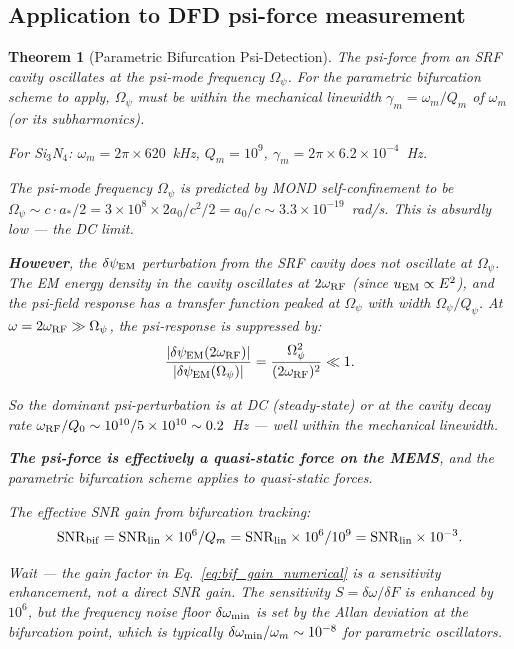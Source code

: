 \documentclass[11pt]{article}
\newcommand{\Opsi}{\Omega_\psi}
\newcommand{\ee}[1]{\times 10^{#1}}
\newcommand{\Qpsi}{Q_\psi}
\newcommand{\SNR}{\mathrm{SNR}}
\newcommand{\dpsiEM}{\delta\psi_{\rm EM}}
\newtheorem{theorem}{Theorem}[section]
\theoremstyle{definition}
\theoremstyle{remark}
\begin{document}
\subsection{Application to DFD psi-force measurement}

\begin{theorem}[Parametric Bifurcation Psi-Detection]
\label{thm:parametric}
The psi-force from an SRF cavity oscillates at the psi-mode frequency
$\Opsi$. For the parametric bifurcation scheme to apply, $\Opsi$ must
be within the mechanical linewidth $\gamma_m = \omega_m/Q_m$ of
$\omega_m$ (or its subharmonics).

For Si$_3$N$_4$: $\omega_m = 2\pi \times 620$~kHz, $Q_m = 10^9$,
$\gamma_m = 2\pi \times 6.2\ee{-4}$~Hz.

The psi-mode frequency $\Opsi$ is predicted by MOND self-confinement
to be $\Opsi \sim c \cdot a_*/2 = 3\ee{8} \times 2a_0/c^2 / 2
= a_0/c \sim 3.3\ee{-19}$~rad/s. This is absurdly low --- the
DC limit.

\textbf{However}, the $\dpsiEM$ perturbation from the SRF cavity
does \emph{not} oscillate at $\Opsi$. The EM energy density in the
cavity oscillates at $2\omega_{\rm RF}$ (since $u_{\rm EM} \propto
E^2$), and the psi-field response has a transfer function peaked at
$\Opsi$ with width $\Opsi/\Qpsi$. At $\omega = 2\omega_{\rm RF}
\gg \Opsi$, the psi-response is suppressed by:
\begin{equation}
\frac{|\dpsiEM(2\omega_{\rm RF})|}{|\dpsiEM(\Opsi)|}
= \frac{\Opsi^2}{(2\omega_{\rm RF})^2} \ll 1.
\end{equation}

So the dominant psi-perturbation is at DC (steady-state) or at the
cavity decay rate $\omega_{\rm RF}/Q_0 \sim 10^{10}/5\ee{10}
\sim 0.2$~Hz --- well within the mechanical linewidth.

\textbf{The psi-force is effectively a quasi-static force on the
MEMS}, and the parametric bifurcation scheme applies to quasi-static
forces.

The effective SNR gain from bifurcation tracking:
\begin{equation}
\SNR_{\rm bif} = \SNR_{\rm lin} \times 10^6 / Q_m
= \SNR_{\rm lin} \times 10^6 / 10^9 = \SNR_{\rm lin} \times 10^{-3}.
\end{equation}

Wait --- the gain factor in Eq.~\eqref{eq:bif_gain_numerical} is a
\emph{sensitivity} enhancement, not a direct SNR gain. The
sensitivity $S = \delta\omega/\delta F$ is enhanced by $10^6$, but
the frequency noise floor $\delta\omega_{\rm min}$ is set by the
Allan deviation at the bifurcation point, which is typically
$\delta\omega_{\rm min}/\omega_m \sim 10^{-8}$ for parametric
oscillators.


\end{theorem}
\end{document}
